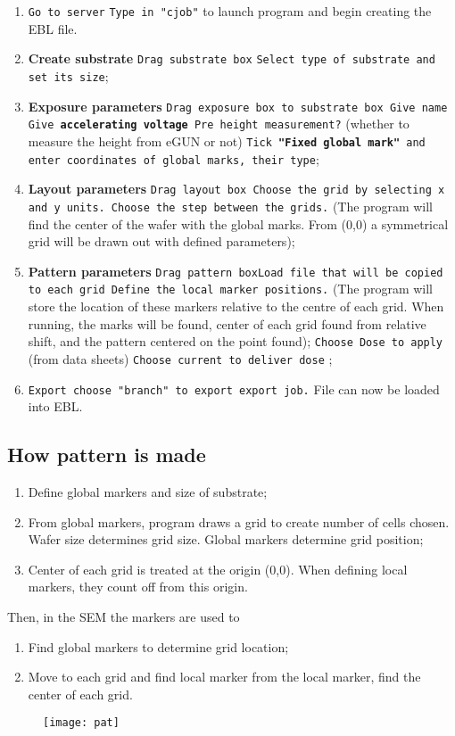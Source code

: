    \begin{enumerate}
   	\item \texttt{Go to server} \ra \texttt{Type in "cjob"} to launch program and begin creating the EBL file.
   	\item \textbf{Create substrate} \texttt{Drag substrate box} \ra \texttt{Select type of substrate and set its size};
   	\item \textbf{Exposure parameters} \texttt{Drag exposure box to substrate box \ra Give name \ra Give \textbf{accelerating voltage} \ra Pre height measurement?} (whether to measure the height from eGUN or not) \ra \texttt{Tick \textbf{"Fixed global mark"} and enter coordinates of global marks, their type};
   	\item \textbf{Layout parameters} \texttt{Drag layout box \ra Choose the grid by selecting x and y units. Choose the step between the grids.} (The program will find the center of the wafer with the global marks. From (0,0) a symmetrical grid will be drawn out with defined parameters);
   	\item \textbf{Pattern parameters} \texttt{Drag pattern box\ra Load file that will be copied to each grid \ra Define the local marker positions.} (The program will store the location of these markers relative to the centre of each grid. When running, the marks will be found, center of each grid found from relative shift, and the pattern centered on the point found); \ra \texttt{Choose Dose to apply} (from data sheets) \ra \texttt{Choose current to deliver dose} ;
   	\item \texttt{Export \ra choose "branch" to export \ra export job.} File can now be loaded into EBL.
   \end{enumerate}


 \subsection{How pattern is made}
  \begin{enumerate}
  	\item Define global markers and size of substrate;
  	\item From global markers, program draws a grid to create number of cells chosen. Wafer size determines grid size. Global markers determine grid position;
  	\item Center of each grid is treated at the origin (0,0). When defining local markers, they count off from this origin.
  \end{enumerate}

  Then, in the SEM the markers are used to
   \begin{enumerate}
   	\item Find global markers to determine grid location;
   	\item Move to each grid and find local marker \ra from the local marker, find the center of each grid.
   \end{enumerate}

  
  \begin{figure}[h]
	\centering
	\texttt{[image: pat]}
	\label{fig:pat}
  \end{figure}

\newpage